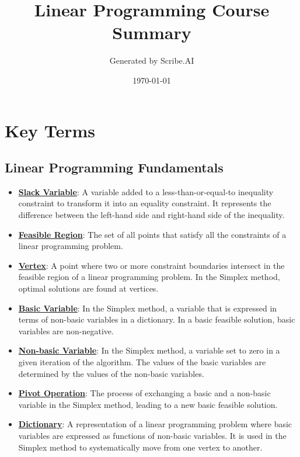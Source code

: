 \documentclass{article}%
\title{Linear Programming Course Summary}%
\author{Generated by Scribe.AI}%
\date{\today}%
\begin{document}
%
\normalsize%
\maketitle%
\section{Key Terms}%
\label{sec:KeyTerms}%
\subsection{Linear Programming Fundamentals}%
\label{subsec:LinearProgrammingFundamentals}%
\begin{itemize}[leftmargin=*]%
\item \href{https://www.math.purdue.edu/~yipn/421/2024-08-27-ExSimplex.pdf#page=1}{\textbf{Slack Variable}}: A variable added to a less-than-or-equal-to inequality constraint to transform it into an equality constraint. It represents the difference between the left-hand side and right-hand side of the inequality.%
\item \href{https://www.math.purdue.edu/~yipn/421/2024-08-27-ExSimplex.pdf#page=4}{\textbf{Feasible Region}}: The set of all points that satisfy all the constraints of a linear programming problem.%
\item \href{https://www.math.purdue.edu/~yipn/421/2024-08-27-ExSimplex.pdf#page=5}{\textbf{Vertex}}: A point where two or more constraint boundaries intersect in the feasible region of a linear programming problem. In the Simplex method, optimal solutions are found at vertices.%
\item \href{https://www.math.purdue.edu/~yipn/421/2024-08-27-ExSimplex.pdf#page=6}{\textbf{Basic Variable}}: In the Simplex method, a variable that is expressed in terms of non-basic variables in a dictionary. In a basic feasible solution, basic variables are non-negative.%
\item \href{https://www.math.purdue.edu/~yipn/421/2024-08-27-ExSimplex.pdf#page=6}{\textbf{Non-basic Variable}}: In the Simplex method, a variable set to zero in a given iteration of the algorithm. The values of the basic variables are determined by the values of the non-basic variables.%
\item \href{https://www.math.purdue.edu/~yipn/421/2024-08-27-ExSimplex.pdf#page=9}{\textbf{Pivot Operation}}: The process of exchanging a basic and a non-basic variable in the Simplex method, leading to a new basic feasible solution.%
\item \href{https://www.math.purdue.edu/~yipn/421/2024-08-27-ExSimplex.pdf#page=26}{\textbf{Dictionary}}: A representation of a linear programming problem where basic variables are expressed as functions of non-basic variables. It is used in the Simplex method to systematically move from one vertex to another.%

\end{itemize}
\end{document}
